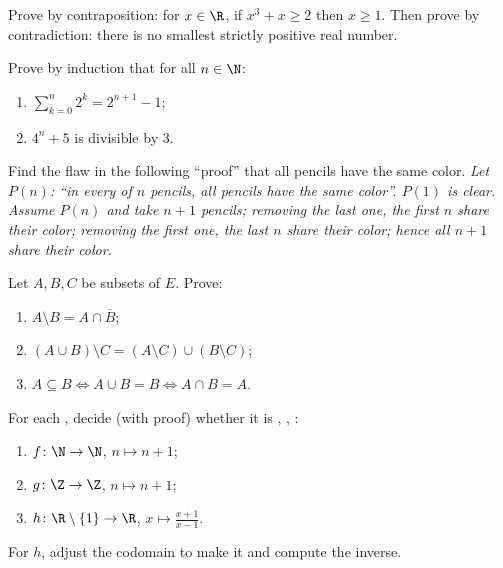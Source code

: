 \begin{exercise}[$\star$]\label{exo:b1:logic:3}
Prove by contraposition: for $x \in \R$, if $x^3 + x \geq 2$ then
$x \geq 1$. Then prove by contradiction: there is no smallest strictly
positive real number.
\end{exercise}

\begin{exercise}[$\star$]\label{exo:b1:logic:4}
Prove by induction that for all $n \in \N$:
\begin{enumerate}
  \item $\sum_{k=0}^{n} 2^k = 2^{n+1} - 1$;
  \item $4^n + 5$ is divisible by $3$.
\end{enumerate}
\end{exercise}

\begin{exercise}[$\star$]\label{exo:b1:logic:5}
Find the flaw in the following ``proof'' that all pencils have the same
color. \emph{Let $P(n)$: ``in every  of $n$ pencils, all pencils
have the same color''. $P(1)$ is clear. Assume $P(n)$ and take $n+1$
pencils; removing the last one, the first $n$ share their color;
removing the first one, the last $n$ share their color; hence all
$n+1$ share their color.}
\end{exercise}

\begin{exercise}[$\star$]\label{exo:b1:logic:6}
Let $A, B, C$ be subsets of $E$. Prove:
\begin{enumerate}
  \item $A \setminus B = A \cap \overline{B}$;
  \item $(A \cup B) \setminus C = (A \setminus C) \cup (B \setminus
        C)$;
  \item $A \subseteq B \iff A \cup B = B \iff A \cap B = A$.
\end{enumerate}
\end{exercise}

\begin{exercise}[$\star\star$]\label{exo:b1:logic:7}
For each , decide (with proof) whether it is , ,
:
\begin{enumerate}
  \item $f \colon \N \to \N$, $n \mapsto n + 1$;
  \item $g \colon \Z \to \Z$, $n \mapsto n + 1$;
  \item $h \colon \R \setminus \{1\} \to \R$, $x \mapsto
        \frac{x+1}{x-1}$.
\end{enumerate}
For $h$, adjust the codomain to make it  and compute the
inverse.
\end{exercise}

